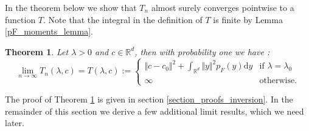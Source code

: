 \documentclass{article}
\newcommand{\RR}{\mathbb{R}}
\theoremstyle{plain}
\newtheorem{theorem}{Theorem}
\theoremstyle{remark}
\theoremstyle{definition}
\begin{document}
In the theorem below we show that $T_n$ almost surely converges pointwise to a function $T$. Note that the integral in the definition of $T$ is finite by Lemma \ref{pF_moments_lemma}.

\begin{theorem}\label{criterion_func_asymptotics}
Let $\lambda > 0$ and $c \in \RR^d$, then with probability one we have :
    \[\lim_{n \to \infty}T_n(\lambda,c) = T(\lambda,c) := \begin{cases} \Vert c - c_0 \Vert^2 + \int_{\RR^d} \Vert y \Vert^2 p_F(y)\mathrm{d}y & \text{if } \lambda=\lambda_0\\
\infty & \text{otherwise}.
\end{cases}\]
\end{theorem}

The proof of Theorem \ref{criterion_func_asymptotics} is given in section \ref{section_proofs_inversion}. In the remainder of this section we derive a few additional limit results, which we need later.
\end{document}
